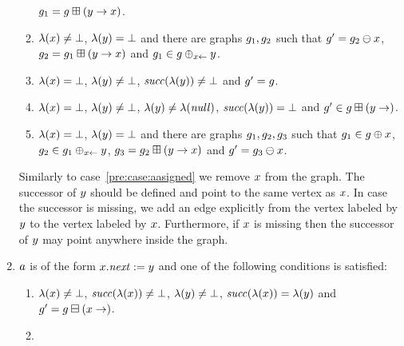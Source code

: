\begin{enumerate}
\begin{enumerate}
    $g_1=g\boxplus({y}\rightarrow{\ensuremath{x}})$.
  \item \label{pre:case:assignedDotNextC}%
    $\lambda(x)\neq\bot$, %
    $\lambda(y)=\bot$ %
    and there are graphs $g_1,g_2$ such that
    $g'=g_2\ominus{\ensuremath{x}}$, %
    $g_2=g_1\boxplus({y}\rightarrow{\ensuremath{x}})$ and %
    $g_1\in g\oplus_{{x}\leftarrow}{y}$.
  \item \label{pre:case:assignedDotNextD}%
    $\lambda(x)=\bot$, %
    $\lambda(y)\neq\bot$, %
    ${\it succ}(\lambda(y))\neq\bot$ and %
    $g'=g$.
  \item \label{pre:case:assignedDotNextE}%
    $\lambda(x)=\bot$, %
    $\lambda(y)\neq\bot$, %
    $\lambda(y)\neq\lambda({\it null})$, %
    ${\it succ}(\lambda(y))=\bot$ and %
    $g'\in g\boxplus({y}\rightarrow)$.
  \item \label{pre:case:assignedDotNextF}%
    $\lambda(x)=\bot$, %
    $\lambda(y)=\bot$ %
 and   there are graphs $g_1,g_2,g_3$ such that
    $g_1\in g\oplus{\ensuremath{x}}$, %
    $g_2\in g_1\oplus_{{x}\leftarrow}{y}$, %
    $g_3=g_2\boxplus({y}\rightarrow{\ensuremath{x}})$ and %
    $g'=g_3\ominus{\ensuremath{x}}$.
  \end{enumerate}
Similarly to case~\ref{pre:case:aasigned} we remove $x$ from the graph.
%
The successor of $y$ should be defined and point to the same vertex as $x$.
%
In case the successor is missing, we add an edge explicitly from the vertex
labeled by $y$ to the vertex labeled by $x$.
%
Furthermore, if $x$ is missing then the successor of $y$ may point
anywhere inside the graph.
\item
  $a$ is of the form $x.{\it next}:=y$ and
  one of the following conditions is satisfied:
  \begin{enumerate}
  \item \label{pre:case:dotNextAssignedA}%
    $\lambda(x)\neq\bot$, %
    ${\it succ}(\lambda(x))\neq\bot$, %
    $\lambda(y)\neq\bot$, %
    ${\it succ}(\lambda(x))=\lambda(y)$ and
    $g'=g\boxminus({x}\rightarrow)$.
  \item \label{pre:case:dotNextAssignedB}%

\end{enumerate}
\end{enumerate}
